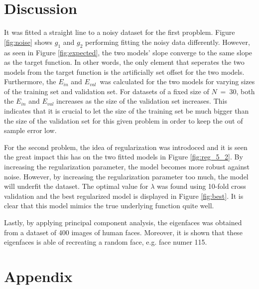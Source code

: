 \documentclass[a4paper,10pt]{article}
\begin{document}
\section{Discussion}
It was fitted a straight line to a noisy dataset for the first propblem.
Figure {\ref{fig:noise}} shows $g_1$ and $g_2$ performing fitting the
noisy data differently. However, as seen in Figure {\ref{fig:expected}},
the two models' slope converge to the same slope as the target function.
In other words, the only element that seperates the two models from the
target function is the artificially set offset for the two models.
Furthermore, the $E_{in}$ and $E_{val}$ was calculated for the two models
for varying sizes of the training set and validation set. For datasets
of a fixed size of $N\ =\ 30$, both the $E_{in}$ and $E_{val}$ increases
as the size of the validation set increases. This indicates that it is
crucial to let the size of the training set be much bigger than
the size of the validation set for this given problem in order to keep
the out of sample error low. \newline

For the second problem, the idea of regularization was introdoced and
it is seen the great impact this has on the two fitted models
in Figure {\ref{fig:reg_5_2}}. By increasing the regularization
parameter, the model becomes more robust against noise. However,
by increasing the regularization parameter too much,
the model will underfit the dataset. The optimal
value for $\lambda$ was found using 10-fold cross
validation and the best regularized model is
displayed in Figure {\ref{fig:best}}. It is
clear that this model mimics the true underlying
function quite well. \newline

Lastly, by applying principal component analysis,
the eigenfaces was obtained from a dataset of
400 images of human faces.
Moreover, it is shown that
these eigenfaces is able of recreating a random face,
e.g. face numer 115.

\section{Appendix}


\begin{verbatim}



\end{verbatim}
\end{document}
